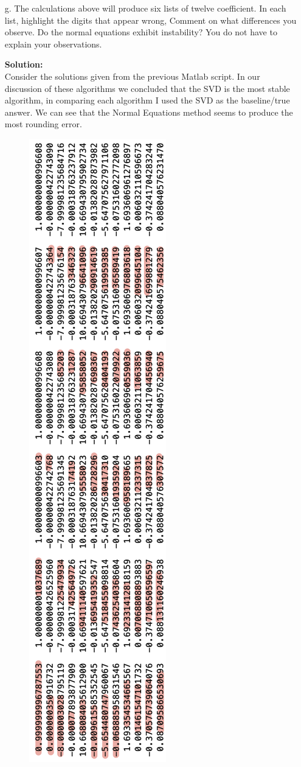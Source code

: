 \documentclass[12pt]{article}
\makeatletter
\theoremstyle{homework}
\newenvironment{exercise}[1]
{\def\@currentlabel{#1}\exercisecore}
{\endexercisecore}
\newcommand{\localhead}[1]{\par\smallskip\noindent\textbf{#1}\nobreak\\}%
\newcommand\solution{\localhead{Solution:}}
\makeatother
\begin{document}
\begin{exercise}{11.3}
\begin{enumerate}
    \item[g.] The calculations above will produce six lists of twelve coefficient. In each list, highlight the digits that appear 
    wrong, Comment on what differences you observe. Do the normal equations exhibit instability? You do not have to explain your observations.\\
    \solution Consider the solutions given from the previous Matlab script. In our discussion of these algorithms we concluded that the SVD is the most stable algorithm, in comparing each algorithm I used 
    the SVD as the baseline/true answer. We can see that the Normal Equations method seems to produce the most
    rounding error.  
    \begin{figure}[H]
      \begin{center}
      \includegraphics[width = .33\textwidth]{plot1.png}
      \end{center}
    \end{figure}



    
  \end{enumerate}
  
\end{exercise}
\end{document}

